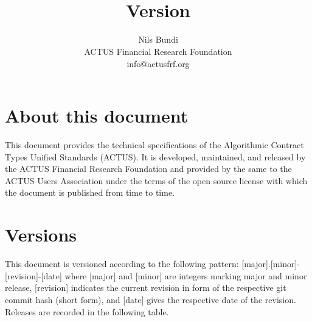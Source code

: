 \documentclass[9pt,oneside]{amsart}
\title{\doctitle \\
      {\smaller \textbf{Version \VersionNumber}}}
\author{
	Nils Bundi\\
	ACTUS Financial Research Foundation\\
	info@actusfrf.org
}
\begin{document}
%

\maketitle


\section*{About this document}\label{sec:about}

This document provides the technical specifications of the Algorithmic Contract Types Unified Standards (ACTUS). It is developed, maintained, and released by the ACTUS Financial Research Foundation and provided by the same to the ACTUS Users Association under the terms of the open source license with which the document is published from time to time.


\section*{Versions}\label{sec:version}

This document is versioned according to the following pattern: [major].[minor]-[revision]-[date] where [major] and [minor] are integers marking major and minor release, [revision] indicates the current revision in form of the respective git commit hash (short form), and [date] gives the respective date of the revision. Releases are recorded in the following table.
\end{document}
